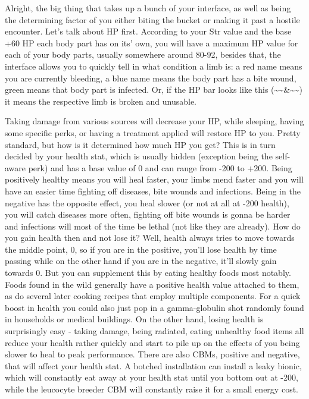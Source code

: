 Alright, the big thing that takes up a bunch of your interface, as well as being the determining factor of you either biting the bucket or making it past a hostile encounter. Let's talk about HP first. According to your Str value and the base +60 HP each body part has on its' own, you will have a maximum HP value for each of your body parts, usually somewhere around 80-92, besides that, the interface allows you to quickly tell in what condition a limb is: a red name means you are currently bleeding, a blue name means the body part has a bite wound, green means that body part is infected. Or, if the HP bar looks like this (\~{}\~{}\&\~{}\~{}) it means the respective limb is broken and unusable.

Taking damage from various sources will decrease your HP, while sleeping, having some specific perks, or having a treatment applied will restore HP to you. Pretty standard, but how is it determined how much HP you get? This is in turn decided by your health stat, which is usually hidden (exception being the self-aware perk) and has a base value of 0 and can range from -200 to +200. Being positively healthy means you will heal faster, your limbs mend faster and you will have an easier time fighting off diseases, bite wounds and infections. Being in the negative has the opposite effect, you heal slower (or not at all at -200 health), you will catch diseases more often, fighting off bite wounds is gonna be harder and infections will most of the time be lethal (not like they are already). How do you gain health then and not lose it? Well, health always tries to move towards the middle point, 0, so if you are in the positive, you'll lose health by time passing while on the other hand if you are in the negative, it'll slowly gain towards 0. But you can supplement this by eating healthy foods most notably. Foods found in the wild generally have a positive health value attached to them, as do several later cooking recipes that employ multiple components. For a quick boost in health you could also just pop in a gamma-globulin shot randomly found in households or medical buildings. On the other hand, losing health is surprisingly easy - taking damage, being radiated, eating unhealthy food items all reduce your health rather quickly and start to pile up on the effects of you being slower to heal to peak performance. There are also CBMs, positive and negative, that will affect your health stat. A botched installation can install a leaky bionic, which will constantly eat away at your health stat until you bottom out at -200, while the leucocyte breeder CBM will constantly raise it for a small energy cost.

